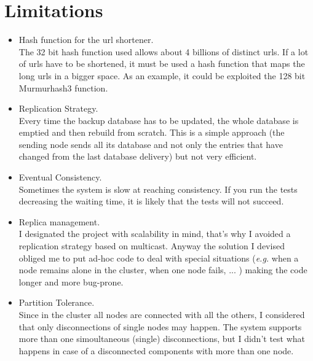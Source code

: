 \documentclass{article}
\begin{document}
\section{Limitations} 
\begin{itemize}
\item Hash function for the url shortener. \\
The 32 bit hash function used allows about 4 billions of distinct urls. If a lot of urls have to be shortened, it must be used a hash function that maps the long urls in a bigger space. As an example, it could be exploited the 128 bit Murmurhash3 function.
\item Replication Strategy. \\
Every time the backup database has to be updated, the whole database is emptied and then rebuild from scratch. This is a simple approach (the sending node sends all its database and not only the entries that have changed from the last database delivery) but not very efficient.
\item Eventual Consistency. \\
Sometimes the system is slow at reaching consistency. If you run the tests decreasing the waiting time, it is likely that the tests will not succeed.
\item Replica management. \\
I designated the project with scalability in mind, that's why I avoided a replication strategy based on multicast. Anyway the solution I devised obliged me to put ad-hoc code to deal with special situations (\textit{e.g.} when a node remains alone in the cluster, when one node fails, ... ) making the code longer and more bug-prone.  
\item Partition Tolerance. \\
Since in the cluster all nodes are connected with all the others, I considered that only disconnections of single nodes may happen. The system supports more than one simoultaneous (single) disconnections, but I didn't test what happens in case of a disconnected components with more than one node.
\end{itemize}
\end{document}
